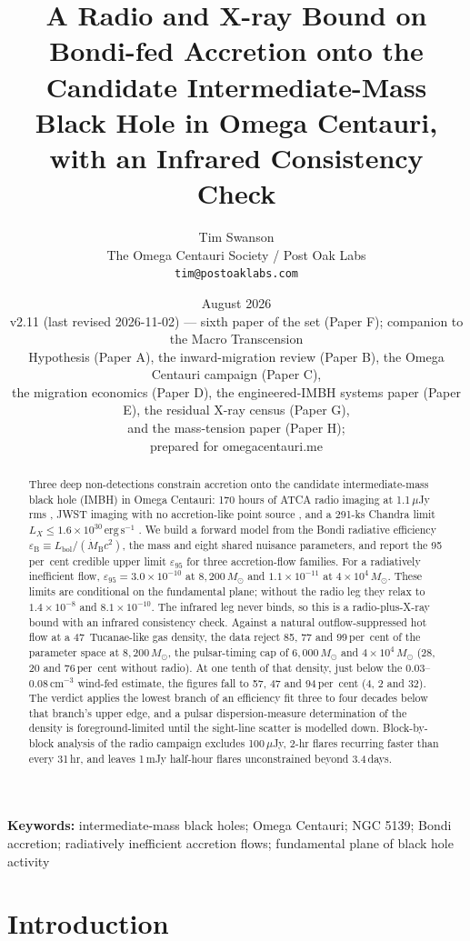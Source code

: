 \documentclass[11pt]{article}
\title{\textbf{A Radio and X-ray Bound on Bondi-fed Accretion onto the Candidate Intermediate-Mass Black Hole in Omega Centauri, with an Infrared Consistency Check}}
\author{Tim Swanson\\[2pt]
\small The Omega Centauri Society / Post Oak Labs\\
\small \texttt{tim@postoaklabs.com}}
\date{August 2026 \\[4pt] \small v2.11 (last revised 2026-11-02) --- sixth paper of the set (Paper F); companion to the Macro Transcension\\ \small Hypothesis (Paper A), the inward-migration review (Paper B), the Omega Centauri campaign (Paper C),\\ \small the migration economics (Paper D), the engineered-IMBH systems paper (Paper E), the residual X-ray census (Paper G),\\ \small and the mass-tension paper (Paper H);\\ \small prepared for omegacentauri.me}
\newcommand{\msun}{\ensuremath{M_\odot}}
\newcommand{\mdotB}{\ensuremath{\dot{M}_{\mathrm{B}}}}
\newcommand{\eps}{\ensuremath{\varepsilon_{\mathrm{B}}}}
\newcommand{\epsl}{\ensuremath{\varepsilon_{95}}}
\begin{document}
\maketitle

\begin{abstract}
\noindent
Three deep non-detections constrain accretion onto the candidate intermediate-mass black hole (IMBH) in Omega Centauri: 170 hours of ATCA radio imaging at 1.1\,$\mu$Jy rms \citep{Mahida2026}, JWST imaging with no accretion-like point source \citep{Chen2025JWST}, and a 291-ks Chandra limit $L_X \leq 1.6\times10^{30}\,\mathrm{erg\,s^{-1}}$ \citep{Haggard2013}. We build a forward model from the Bondi radiative efficiency $\eps \equiv L_{\mathrm{bol}}/(\mdotB c^{2})$, the mass and eight shared nuisance parameters, and report the 95\,per~cent credible upper limit $\epsl$ for three accretion-flow families. For a radiatively inefficient flow, $\epsl = 3.0\times10^{-10}$ at $8{,}200\,\msun$ and $1.1\times10^{-11}$ at $4\times10^{4}\,\msun$. These limits are conditional on the fundamental plane; without the radio leg they relax to $1.4\times10^{-8}$ and $8.1\times10^{-10}$. The infrared leg never binds, so this is a radio-plus-X-ray bound with an infrared consistency check. Against a natural outflow-suppressed hot flow at a 47~Tucanae-like gas density, the data reject 85, 77 and 99\,per~cent of the parameter space at $8{,}200\,\msun$, the pulsar-timing cap of $6{,}000\,\msun$ and $4\times10^{4}\,\msun$ (28, 20 and 76\,per~cent without radio). At one tenth of that density, just below the 0.03--0.08\,$\mathrm{cm^{-3}}$ wind-fed estimate, the figures fall to 57, 47 and 94\,per~cent (4, 2 and 32). The verdict applies the lowest branch of an efficiency fit three to four decades below that branch's upper edge, and a pulsar dispersion-measure determination of the density is foreground-limited until the sight-line scatter is modelled down. Block-by-block analysis of the radio campaign excludes 100\,$\mu$Jy, 2-hr flares recurring faster than every 31\,hr, and leaves 1\,mJy half-hour flares unconstrained beyond 3.4\,days.
\end{abstract}

\bigskip
\noindent\textbf{Keywords:} intermediate-mass black holes; Omega Centauri; NGC 5139; Bondi accretion; radiatively inefficient accretion flows; fundamental plane of black hole activity

\newpage
\tableofcontents
\newpage

\section{Introduction}
\label{sec:intro}
\end{document}
